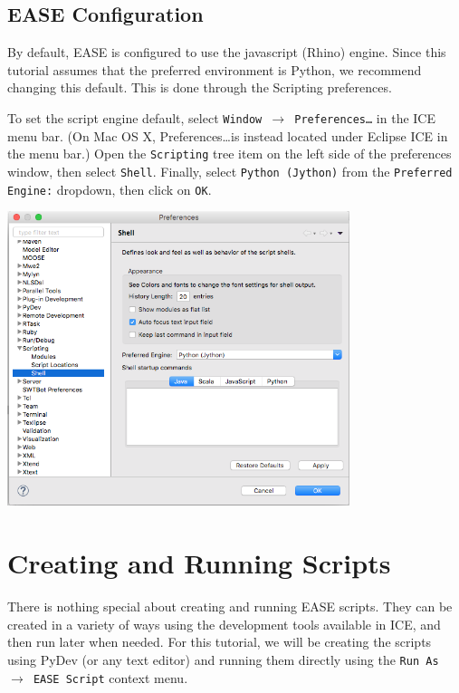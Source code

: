 \subsection{EASE Configuration}

By default, EASE is configured to use the javascript (Rhino) engine. Since this
tutorial assumes that the preferred environment is Python, we recommend changing
this default. This is done through the Scripting preferences.

To set the script engine default, select \texttt{Window $\rightarrow$
Preferences\ldots} in the ICE menu bar. (On Mac OS X, Preferences\ldots is
instead located under Eclipse ICE in the menu bar.) Open the \texttt{Scripting}
tree item on the left side of the preferences window, then select
\texttt{Shell}. Finally, select \texttt{Python (Jython)} from the
\texttt{Preferred Engine:} dropdown, then click on \texttt{OK}.

\begin{center}
\includegraphics[width=10cm]{images/scripting-prefs}
\end{center}


\section{Creating and Running Scripts}

There is nothing special about creating and running EASE scripts. They can be
created in a variety of ways using the development tools available in ICE, and
then run later when needed. For this tutorial, we will be creating the scripts
using PyDev (or any text editor) and running them directly using the \texttt{Run As
$\rightarrow$ EASE Script} context menu.

